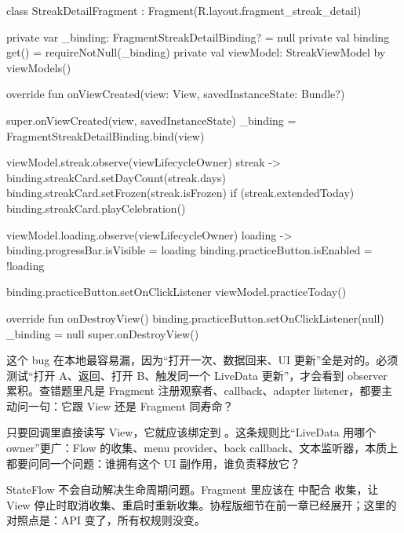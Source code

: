 \begin{ktfix}
class StreakDetailFragment : Fragment(R.layout.fragment_streak_detail) {
    private var _binding: FragmentStreakDetailBinding? = null
    private val binding get() = requireNotNull(_binding)
    private val viewModel: StreakViewModel by viewModels()

    override fun onViewCreated(view: View, savedInstanceState: Bundle?) {
        super.onViewCreated(view, savedInstanceState)
        _binding = FragmentStreakDetailBinding.bind(view)

        viewModel.streak.observe(viewLifecycleOwner) { streak ->
            binding.streakCard.setDayCount(streak.days)
            binding.streakCard.setFrozen(streak.isFrozen)
            if (streak.extendedToday) {
                binding.streakCard.playCelebration()
            }
        }

        viewModel.loading.observe(viewLifecycleOwner) { loading ->
            binding.progressBar.isVisible = loading
            binding.practiceButton.isEnabled = !loading
        }

        binding.practiceButton.setOnClickListener {
            viewModel.practiceToday()
        }
    }

    override fun onDestroyView() {
        binding.practiceButton.setOnClickListener(null)
        _binding = null
        super.onDestroyView()
    }
}
\end{ktfix}

\begin{pitfall}[单次路径测不出来]
这个 bug 在本地最容易漏，因为“打开一次、数据回来、UI 更新”全是对的。必须测试“打开 A、返回、打开 B、触发同一个 LiveData 更新”，才会看到 observer 累积。查错题里凡是 Fragment 注册观察者、callback、adapter listener，都要主动问一句：它跟 View 还是 Fragment 同寿命？
\end{pitfall}

\begin{idea}
只要回调里直接读写 View，它就应该绑定到 。这条规则比“LiveData 用哪个 owner”更广：Flow 的收集、menu provider、back callback、文本监听器，本质上都要问同一个问题：谁拥有这个 UI 副作用，谁负责释放它？
\end{idea}

\begin{followup}
StateFlow 不会自动解决生命周期问题。Fragment 里应该在  中配合  收集，让 View 停止时取消收集、重启时重新收集。协程版细节在前一章已经展开；这里的对照点是：API 变了，所有权规则没变。
\end{followup}

